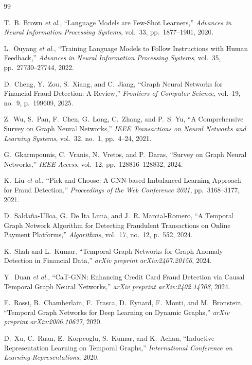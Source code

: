 \documentclass[10pt,letterpaper]{article}
\begin{document}
\begin{thebibliography}{99}

T.~B. Brown \emph{et al.},
``Language Models are Few-Shot Learners,''
\emph{Advances in Neural Information Processing Systems}, vol.~33, pp.~1877--1901, 2020.

L.~Ouyang \emph{et al.},
``Training Language Models to Follow Instructions with Human Feedback,''
\emph{Advances in Neural Information Processing Systems}, vol.~35, pp.~27730--27744, 2022.

D.~Cheng, Y.~Zou, S.~Xiang, and C.~Jiang,
``Graph Neural Networks for Financial Fraud Detection: A Review,''
\emph{Frontiers of Computer Science}, vol.~19, no.~9, p.~199609, 2025.

Z.~Wu, S.~Pan, F.~Chen, G.~Long, C.~Zhang, and P.~S. Yu,
``A Comprehensive Survey on Graph Neural Networks,''
\emph{IEEE Transactions on Neural Networks and Learning Systems}, vol.~32, no.~1, pp.~4--24, 2021.

G.~Gkarmpounis, C.~Vranis, N.~Vretos, and P.~Daras,
``Survey on Graph Neural Networks,''
\emph{IEEE Access}, vol.~12, pp.~128816--128832, 2024.

K.~Liu \emph{et al.},
``Pick and Choose: A GNN-based Imbalanced Learning Approach for Fraud Detection,''
\emph{Proceedings of the Web Conference 2021}, pp.~3168--3177, 2021.

D.~Salda\~na-Ulloa, G.~De Ita Luna, and J.~R. Marcial-Romero,
``A Temporal Graph Network Algorithm for Detecting Fraudulent Transactions on Online Payment Platforms,''
\emph{Algorithms}, vol.~17, no.~12, p.~552, 2024.

K.~Shah and L.~Kumar,
``Temporal Graph Networks for Graph Anomaly Detection in Financial Data,''
\emph{arXiv preprint arXiv:2407.20156}, 2024.

Y.~Duan \emph{et al.},
``CaT-GNN: Enhancing Credit Card Fraud Detection via Causal Temporal Graph Neural Networks,''
\emph{arXiv preprint arXiv:2402.14708}, 2024.

E.~Rossi, B.~Chamberlain, F.~Frasca, D.~Eynard, F.~Monti, and M.~Bronstein,
``Temporal Graph Networks for Deep Learning on Dynamic Graphs,''
\emph{arXiv preprint arXiv:2006.10637}, 2020.

D.~Xu, C.~Ruan, E.~Korpeoglu, S.~Kumar, and K.~Achan,
``Inductive Representation Learning on Temporal Graphs,''
\emph{International Conference on Learning Representations}, 2020.


\end{thebibliography}
\end{document}
